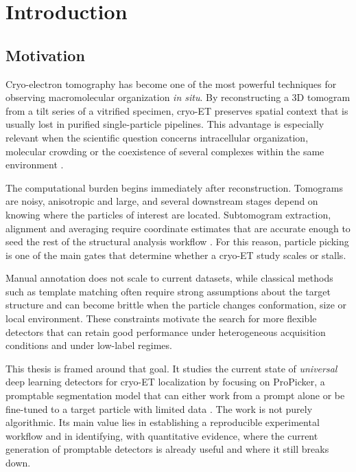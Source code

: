 \documentclass[12pt,a4paper]{report}
\begin{document}
\cleardoublepage

\chapter{Introduction}

\section{Motivation}
Cryo-electron tomography has become one of the most powerful techniques for observing macromolecular organization \emph{in situ}. By reconstructing a 3D tomogram from a tilt series of a vitrified specimen, cryo-ET preserves spatial context that is usually lost in purified single-particle pipelines. This advantage is especially relevant when the scientific question concerns intracellular organization, molecular crowding or the coexistence of several complexes within the same environment \cite{lucic2013cryoet,beck2016cryoet}.

The computational burden begins immediately after reconstruction. Tomograms are noisy, anisotropic and large, and several downstream stages depend on knowing where the particles of interest are located. Subtomogram extraction, alignment and averaging require coordinate estimates that are accurate enough to seed the rest of the structural analysis workflow \cite{castanodiez2012dynamo,scheres2012relion}. For this reason, particle picking is one of the main gates that determine whether a cryo-ET study scales or stalls.

Manual annotation does not scale to current datasets, while classical methods such as template matching often require strong assumptions about the target structure and can become brittle when the particle changes conformation, size or local environment. These constraints motivate the search for more flexible detectors that can retain good performance under heterogeneous acquisition conditions and under low-label regimes.

This thesis is framed around that goal. It studies the current state of \emph{universal} deep learning detectors for cryo-ET localization by focusing on ProPicker, a promptable segmentation model that can either work from a prompt alone or be fine-tuned to a target particle with limited data \cite{wiedemann2025propicker}. The work is not purely algorithmic. Its main value lies in establishing a reproducible experimental workflow and in identifying, with quantitative evidence, where the current generation of promptable detectors is already useful and where it still breaks down.
\end{document}
